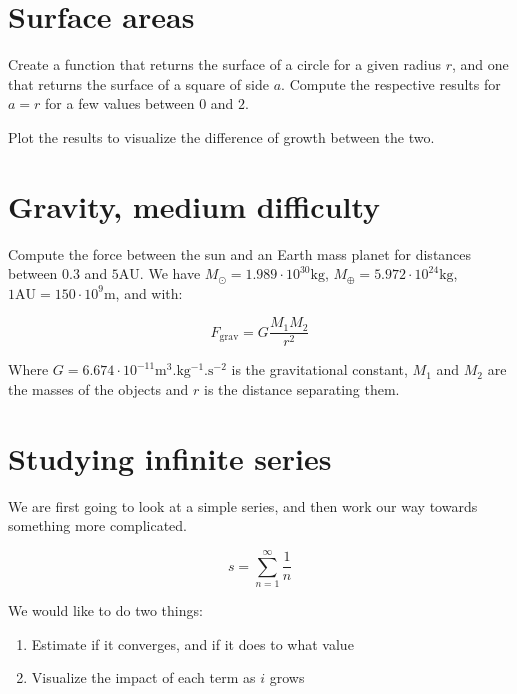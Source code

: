 \documentclass[twocolumn]{article}
\begin{document}
\section{Surface areas}\label{sec:surfaces}

Create a function that returns the surface of a circle for a given radius $r$, and one that returns the surface of a square of side $a$. Compute the respective results for $a=r$ for a few values between $0$ and $2$.

Plot the results to visualize the difference of growth between the two.

\section{Gravity, medium difficulty}\label{sec:gravity_medium}

Compute the force between the sun and an Earth mass planet for distances between $0.3$ and $5\mathrm{AU}$. We have $M_\odot = 1.989\cdot10^{30}\mathrm{kg}$, $M_\oplus = 5.972\cdot10^{24}\mathrm{kg}$, $1\mathrm{AU} = 150\cdot10^{9}\mathrm{m}$, and with:

\begin{equation}
    F_{\mathrm{grav}} = G\frac{M_1M_2}{r^2}
\end{equation}

Where $G = 6.674\cdot10^{-11}\mathrm{m^3.kg^{-1}.s^{-2}}$ is the gravitational constant, $M_1$ and $M_2$ are the masses of the objects and $r$ is the distance separating them.

\section{Studying infinite series}\label{sec:infinite}

We are first going to look at a simple series, and then work our way towards something more complicated.

\begin{equation}\label{eq:inf_serie_0}
    s = \sum_{n=1}^{\infty} \frac{1}{n}
\end{equation}

We would like to do two things:

\begin{enumerate}
    \item Estimate if it converges, and if it does to what value
    \item Visualize the impact of each term as $i$ grows
\end{enumerate}
\end{document}
